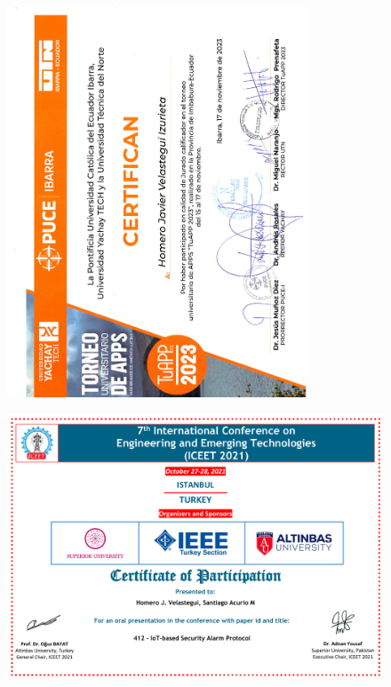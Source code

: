 \begin{figure}[ht]
    \setlength{\parindent}{-25pt}
    \includegraphics[width=0.8\textwidth, angle=-90]{4.-Meritos/Certificados/7.pdf}
\end{figure}

\begin{figure}[ht]
    \setlength{\parindent}{-25pt}
    \includegraphics[width=\textwidth]{4.-Meritos/Certificados/6.pdf}
\end{figure}

